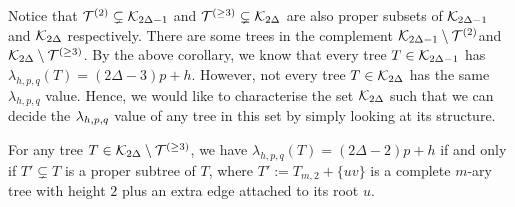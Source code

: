 Notice that ${\cal T}^{(2)} \subsetneq {\cal K}_{2\Delta-1}$ and ${\cal T}^{(\ge 3)} \subsetneq {\cal K}_{2\Delta}$ are also proper subsets of ${\cal K}_{2\Delta-1}$ and ${\cal K}_{2\Delta}$ respectively. There are some trees in the complement ${\cal K}_{2\Delta-1} \setminus {\cal T}^{(2)}$and ${\cal K}_{2\Delta} \setminus {\cal T}^{(\ge 3)}$. By the above corollary, we know that every tree $T \in {\cal K}_{2\Delta-1}$ has $\lambda_{h,p,q}(T)= (2\Delta-3)p+h$. However, not every tree $T \in {\cal K}_{2\Delta}$ has the same $\lambda_{h,p,q}$ value. Hence, we would like to characterise the set ${\cal K}_{2\Delta}$ such that we can decide the $\lambda_{h,p,q}$ value of any tree in this set by simply looking at its structure.

\begin{proposition}
\label{character}
For any tree $T \in {\cal K}_{2\Delta} \setminus {\cal T}^{(\ge 3)}$, we have $\lambda_{h,p,q}(T) = (2\Delta-2)p+h$ if and only if $T' \subsetneq T$ is a proper subtree of $T$, where $T' := T_{m,2} + \{uv\}$ is a complete $m$-ary tree with height $2$ plus an extra edge attached to its root $u$. 
\end{proposition}

